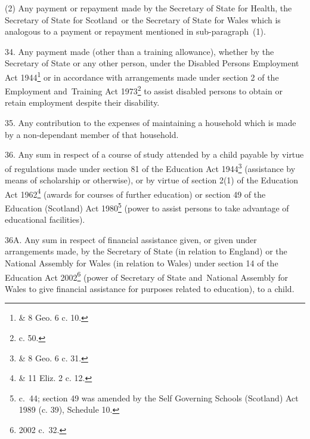 \documentclass[12pt,a4paper]{article}
\begin{document}
(2) Any payment or repayment made by the Secretary of State for Health, the Secretary of State for Scotland~or the Secretary of State for Wales which is analogous to a payment or repayment mentioned in sub-paragraph~(1).

\medskip

34.  Any payment made (other than a training allowance), whether by the Secretary of State or any other person, under the Disabled Persons Employment Act 1944\footnote{ \& 8 Geo. 6 c. 10.} or in accordance with arrangements made under section 2 of the Employment and~Training Act 1973\footnote{ c. 50.} to assist disabled persons to obtain or retain employment despite their disability.

\medskip

35.  Any contribution to the expenses of maintaining a household which is made by a non-dependant member of that household.

\medskip

36.  Any sum in respect of a course of study attended by a child payable by virtue of regulations made under section 81 of the Education Act 1944\footnote{ \& 8 Geo. 6 c. 31.} (assistance by means of scholarship or otherwise), or by virtue of section 2(1) of the Education Act 1962\footnote{ \& 11 Eliz. 2 c. 12.} (awards for courses of further education) or section 49 of the Education (Scotland) Act 1980\footnote{ c.~44; section 49 was amended by the Self Governing Schools (Scotland) Act 1989 (c. 39), Schedule 10.} (power to assist persons to take advantage of educational facilities).

\medskip

36A.  Any sum in respect of financial assistance given, or given under arrangements made, by the Secretary of State (in relation to England) or the National Assembly for Wales (in relation to Wales) under section 14 of the Education Act 2002\footnote{2002 c.\ 32.} (power of Secretary of State and~National Assembly for Wales to give financial assistance for purposes related to education), to a child.


\medskip
\end{document}
